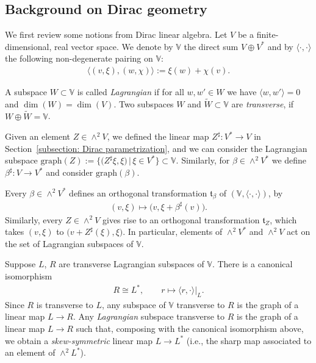 \documentclass[pdftex]{sigma}
\numberwithin{equation}{section}
\newcommand{\V}{\mathbb{V}}
\renewcommand{\t}{\mathfrak{t}}
\begin{document}
\subsection{Background on Dirac geometry}
We first review some notions from Dirac linear algebra. Let $V$ be a finite-dimensional, real vector space. We denote by $\mathbb{V}$ the direct sum $V\oplus V^*$ and by $\langle \cdot,\cdot \rangle$ the following non-degenerate pairing on $\V$:
\begin{gather*} \langle (v,\xi),(w,\chi)\rangle := \xi(w) + \chi(v).\end{gather*}

\begin{Definition}A subspace $W\subset \V$ is called {\em Lagrangian} if for all $w,w'\in W$ we have $\langle w,w'\rangle =0$ and $\dim(W)=\dim(V)$. Two subspaces $W$ and $\tilde{W}\subset \V$ are {\em transverse}, if $W\oplus \tilde{W}=\V$.
\end{Definition}

Given an element $Z\in \wedge^2V$, we defined the linear map $Z^\sharp \colon V^* \to V$ in Section~\ref{subsection: Dirac parametrization}, and we can consider the Lagrangian subspace $\mathrm{graph}(Z) :=\big\{\big(Z^\sharp\xi,\xi\big) \, | \, \xi \in V^*\big\}\subset \V$. Similarly, for $\beta \in \wedge^2 V^*$ we define $\beta^\sharp\colon V\to V^*$ and consider $\mathrm{graph}(\beta)$.

Every $\beta \in \wedge^2 V^*$ defines an orthogonal transformation $\t_\beta$ of $(\V,\langle \cdot,\cdot \rangle)$, by
\begin{gather*}(v,\xi)\mapsto \big(v,\xi+\beta^\sharp(v)\big).\end{gather*}
Similarly, every $Z\in \wedge^2 V$ gives rise to an orthogonal transformation $\t_Z$, which takes $(v,\xi)$ to $\big(v + Z^\sharp(\xi),\xi\big)$. In particular, elements of $\wedge^2 V^*$ and $\wedge^2 V$ act on the set of Lagrangian subspaces of $\V$.

\begin{Remark}\label{rem:graphdirac} Suppose $L$, $R$ are transverse Lagrangian subspaces of $\V$. There is a canonical isomorphism \begin{gather*}R\cong L^*, \qquad r\mapsto \langle r, \cdot \rangle|_L.\end{gather*}
Since $R$ is transverse to $L$, any subspace of $\V$ transverse to $R$ is the graph of a linear map $L\to R$. Any \emph{Lagrangian} subspace transverse to $R$ is the graph of a linear map $L\to R$ such that, composing with the canonical isomorphism above, we obtain a \emph{skew-symmetric} linear map $L\to L^*$ (i.e., the sharp map associated to an element of $\wedge^2 L^*$).
\end{Remark}
\end{document}
